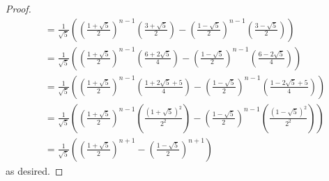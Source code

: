 \documentclass[../main.tex]{subfiles}
\begin{document}
\begin{enumerate}
\begin{enumerate}
\begin{proof}
\begin{align*}
                &= \frac{1}{\sqrt{5}}\left( \left( \frac{1+\sqrt{5}}{2} \right)^{n-1}\left( \frac{3+\sqrt{5}}{2} \right)-\left( \frac{1-\sqrt{5}}{2} \right)^{n-1}\left( \frac{3-\sqrt{5}}{2} \right) \right)\\
                &= \frac{1}{\sqrt{5}}\left( \left( \frac{1+\sqrt{5}}{2} \right)^{n-1}\left( \frac{6+2\sqrt{5}}{4} \right)-\left( \frac{1-\sqrt{5}}{2} \right)^{n-1}\left( \frac{6-2\sqrt{5}}{4} \right) \right)\\
                &= \frac{1}{\sqrt{5}}\left( \left( \frac{1+\sqrt{5}}{2} \right)^{n-1}\left( \frac{1+2\sqrt{5}+5}{4} \right)-\left( \frac{1-\sqrt{5}}{2} \right)^{n-1}\left( \frac{1-2\sqrt{5}+5}{4} \right) \right)\\
                &= \frac{1}{\sqrt{5}}\left( \left( \frac{1+\sqrt{5}}{2} \right)^{n-1}\left( \frac{(1+\sqrt{5})^2}{2^2} \right)-\left( \frac{1-\sqrt{5}}{2} \right)^{n-1}\left( \frac{(1-\sqrt{5})^2}{2^2} \right) \right)\\
                &= \frac{1}{\sqrt{5}}\left( \left( \frac{1+\sqrt{5}}{2} \right)^{n+1}-\left( \frac{1-\sqrt{5}}{2} \right)^{n+1} \right)
            \end{align*}
            \endgroup
            as desired.
        \end{proof}
    \end{enumerate}
\end{enumerate}
\end{document}
